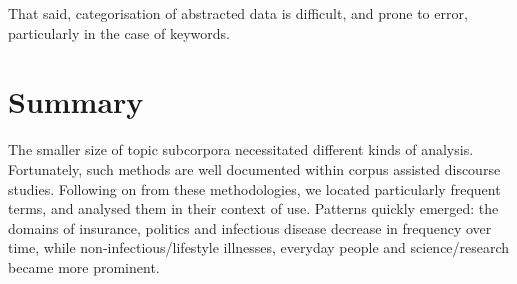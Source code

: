That said, categorisation of abstracted data is difficult, and prone to error, particularly in the case of keywords. %

\section{Summary}

    The smaller size of topic subcorpora necessitated different kinds of analysis. Fortunately, such methods are well documented within corpus assisted discourse studies. Following on from these methodologies, we located particularly frequent terms, and analysed them in their context of use. Patterns quickly emerged: the domains of insurance, politics and infectious disease decrease in frequency over time, while non-infectious\slash lifestyle illnesses, everyday people and science\slash research became more prominent.
